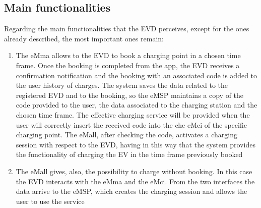 \subsection{Main functionalities}
Regarding the main functionalities that the EVD perceives, except for the ones already described, the most important ones remain:
\begin{enumerate}
    \item The eMma allows to the EVD to book a charging point in a chosen time frame. Once the booking is completed from the app, the EVD receives a confirmation notification and the booking with an associated code is added to the user history of charges. The system saves the data related to the registered EVD and to the booking, so the eMSP maintains a copy of the code provided to the user, the data associated to the charging station and the chosen time frame. The effective charging service will be provided when the user will correctly insert the received code into the che eMci of the specific charging point. The eMall, after checking the code, activates a charging session with respect to the EVD, having in this way that the system provides the functionality of charging the EV in the time frame previously booked
    \item The eMall gives, also, the possibility to charge without booking. In this case the EVD interacts  with the eMma and the eMci. From the two interfaces the data arrive to the eMSP, which creates the charging session and allows the user to use the service
\end{enumerate}